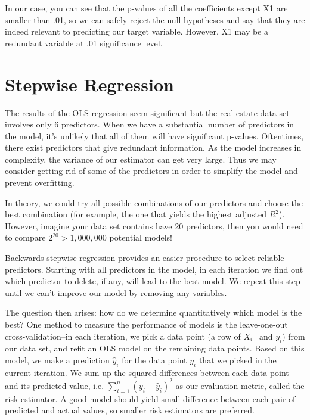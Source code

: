 \documentclass{article}
\begin{document}
In our case, you can see that the p-values of all the coefficients except X1 are smaller than .01, so we can safely reject the null hypotheses and say that they are indeed relevant to predicting our target variable. However, X1 may be a redundant variable at .01 significance level.

\section*{Stepwise Regression}
The results of the OLS regression seem significant but the real estate data set involves only 6 predictors. When we have a substantial number of predictors in the model, it's unlikely that all of them will have significant p-values. Oftentimes, there exist predictors that give redundant information. As the model increases in complexity, the variance of our estimator can get very large. Thus we may consider getting rid of some of the predictors in order to simplify the model and prevent overfitting.

In theory, we could try all possible combinations of our predictors and choose the best combination (for example, the one that yields the highest adjusted $R^2$). However, imagine your data set contains have 20 predictors, then you would need to compare $2^{20} > 1,000,000$ potential models!

Backwards stepwise regression provides an easier procedure to select reliable predictors. Starting with all predictors in the model, in each iteration we find out which predictor to delete, if any, will lead to the best model. We repeat this step until we can't improve our model by removing any variables.

The question then arises: how do we determine quantitatively which model is the best? One method to measure the performance of models is the leave-one-out cross-validation--in each iteration, we pick a data point (a row of $X_{i\cdot}$ and $y_i$) from our data set, and refit an OLS model on the remaining data points. Based on this model, we make a prediction $\hat{y}_{i}$ for the data point $y_i$ that we picked in the current iteration. We sum up the squared differences between each data point and its predicted value, i.e. $\sum_{i=1}^{n} (y_i - \hat{y}_i)^2$ as our evaluation metric, called the risk estimator. A good model should yield small difference between each pair of predicted and actual values, so smaller risk estimators are preferred.
\end{document}
